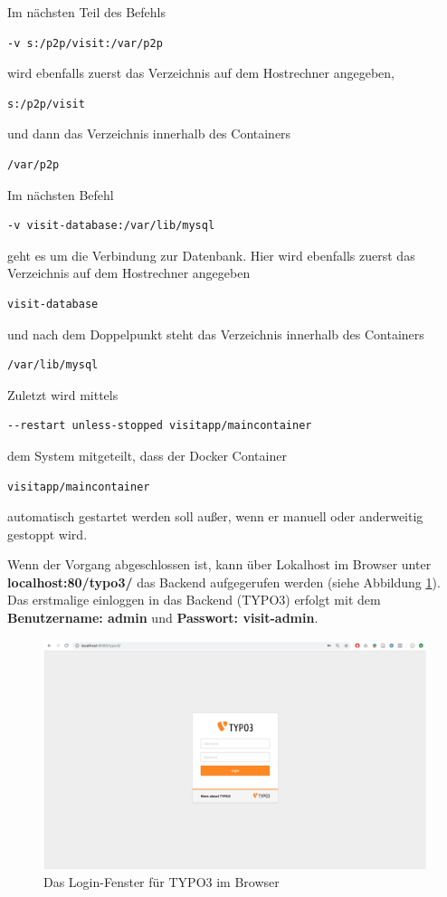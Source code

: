 Im nächsten Teil des Befehls \begin{lstlisting}[style=MyBashStyle]
-v s:/p2p/visit:/var/p2p
\end{lstlisting}
 wird ebenfalls zuerst das Verzeichnis auf dem Hostrechner angegeben, \begin{lstlisting}[style=MyBashStyle]
s:/p2p/visit
\end{lstlisting} und dann das Verzeichnis innerhalb des Containers \begin{lstlisting}[style=MyBashStyle]
/var/p2p
\end{lstlisting}
Im nächsten Befehl \begin{lstlisting}[style=MyBashStyle]
-v visit-database:/var/lib/mysql
\end{lstlisting} geht es um die Verbindung zur Datenbank. Hier wird ebenfalls zuerst das Verzeichnis auf dem Hostrechner angegeben \begin{lstlisting}[style=MyBashStyle]
visit-database
\end{lstlisting} und nach dem Doppelpunkt steht das Verzeichnis innerhalb des Containers \begin{lstlisting}[style=MyBashStyle]
/var/lib/mysql
\end{lstlisting}
Zuletzt wird mittels \begin{lstlisting}[style=MyBashStyle]
--restart unless-stopped visitapp/maincontainer
\end{lstlisting} dem System mitgeteilt, dass der Docker Container \begin{lstlisting}[style=MyBashStyle]
visitapp/maincontainer
\end{lstlisting} automatisch gestartet werden soll außer, wenn er manuell oder anderweitig gestoppt wird.

Wenn der Vorgang abgeschlossen ist, kann über Lokalhost im Browser unter \textbf{localhost:80/typo3/} das Backend aufgegerufen werden (siehe Abbildung \ref{img:typo_3_login}). Das erstmalige einloggen in das Backend (TYPO3) erfolgt mit dem \textbf{Benutzername: admin} und \textbf{Passwort: visit-admin}.

\begin{figure}[ht!]
\centering
\includegraphics[width=12cm]{Figures/paula/typo3/typo_3_login.png}
\caption{Das Login-Fenster für TYPO3 im Browser}
\label{img:typo_3_login}
\end{figure}



